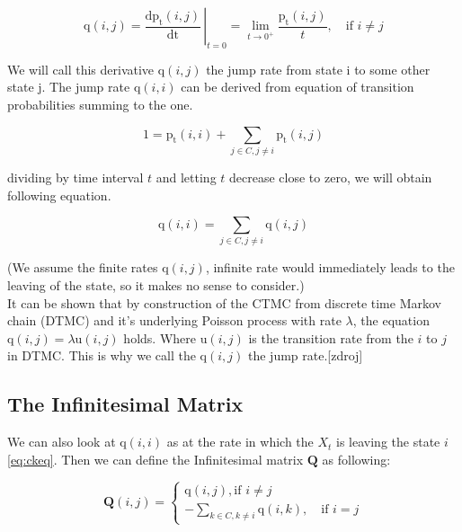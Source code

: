 \documentclass[thesis=M,english]{FITthesis}[2012/10/20]
\newcommand{\matr}[1]{\mathbf{#1}}
\begin{document}
\begin{equation}
\mathrm{q}(i,j) =  \left.\frac{\mathrm{d}\mathrm{p_t}(i,j)}{\mathrm{dt}} \,\right|_{t=0} = \lim_{t \to 0^+} \frac{\mathrm{p_t}(i,j)}{t}, \quad \text{if } i\neq j     
\end{equation}

We will call this derivative $\mathrm{q}(i,j)$ the jump rate from state i to some other state j. The jump rate $\mathrm{q}(i,i)$ can be derived from equation of transition probabilities summing to the one.

\begin{equation}
1 = \mathrm{p_t}(i,i) + \sum_{j \in C ,j \neq i} \mathrm{p_t}(i,j) 
\end{equation}

dividing by time interval $t$ and letting $t$ decrease close to zero, we will obtain following equation. 

\begin{equation}\label{eq:qii}
 \mathrm{q}(i,i) =  \sum_{j \in C ,j \neq i} \mathrm{q}(i,j) 
\end{equation}

(We assume the finite rates $\mathrm{q}(i,j)$, infinite rate would immediately leads to the leaving of the state, so it makes no sense to consider.)\\

It can be shown that by construction of the CTMC from discrete time Markov chain (DTMC) and  it's underlying Poisson process with rate $\lambda$, the equation $\mathrm{q}(i,j) = \lambda\mathrm{u}(i,j)$ holds. Where $\mathrm{u}(i,j)$ is the transition rate from the $i$ to $j$ in DTMC. This is why we call the $\mathrm{q}(i,j)$ the jump rate.[zdroj]  


\subsection{The Infinitesimal Matrix}

We can also look at $\mathrm{q}(i,i)$ as at the rate in which the $X_t$ is leaving the state $i$ \eqref{eq:ckeq}. Then we can define the Infinitesimal matrix $\matr{Q}$ as following:

\begin{equation}  
\matr{Q}(i,j)= 
\begin{cases}
\mathrm{q}(i,j), \text{if } i\neq j\\
- \sum_{k \in C ,k \neq i} \mathrm{q}(i,k), \quad \text{if } i=j
\end{cases}
\end{equation}
\end{document}
